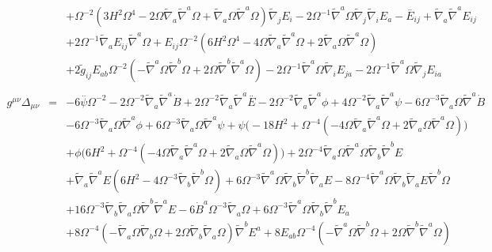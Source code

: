 \documentclass[10pt,letterpaper]{article}
\numberwithin{equation}{section}
\begin{document}
\begin{eqnarray}
&& + \Omega^{-2} (3 H^2 \Omega^4 - 2 \Omega \tilde{\nabla}_{a}\tilde{\nabla}^{a}\Omega + \tilde{\nabla}_{a}\Omega \tilde{\nabla}^{a}\Omega) \tilde{\nabla}_{j}E_{i} - 2 \Omega^{-1} \tilde{\nabla}^{a}\Omega \tilde{\nabla}_{j}\tilde{\nabla}_{i}E_{a}- \overset{..}{E}_{ij} + \tilde{\nabla}_{a}\tilde{\nabla}^{a}E_{ij} \nonumber \\ 
&& + 2 \Omega^{-1} \tilde{\nabla}_{a}E_{ij} \tilde{\nabla}^{a}\Omega + E_{ij} \Omega^{-2} (6 H^2 \Omega^4 - 4 \Omega \tilde{\nabla}_{a}\tilde{\nabla}^{a}\Omega + 2 \tilde{\nabla}_{a}\Omega \tilde{\nabla}^{a}\Omega) \nonumber \\ 
&& + 2 \tilde{g}_{ij} E_{ab} \Omega^{-2} (- \tilde{\nabla}^{a}\Omega \tilde{\nabla}^{b}\Omega + 2 \Omega \tilde{\nabla}^{b}\tilde{\nabla}^{a}\Omega) - 2 \Omega^{-1} \tilde{\nabla}^{a}\Omega \tilde{\nabla}_{i}E_{ja} - 2 \Omega^{-1} \tilde{\nabla}^{a}\Omega \tilde{\nabla}_{j}E_{ia}
\\  \nonumber\\ 
g^{\mu\nu}\Delta_{\mu\nu}&=& -6 \overset{..}{\psi} \Omega^{-2} - 2 \Omega^{-2} \tilde{\nabla}_{a}\tilde{\nabla}^{a}\dot{B} + 2 \Omega^{-2} \tilde{\nabla}_{a}\tilde{\nabla}^{a}\overset{..}{E} - 2 \Omega^{-2} \tilde{\nabla}_{a}\tilde{\nabla}^{a}\phi + 4 \Omega^{-2} \tilde{\nabla}_{a}\tilde{\nabla}^{a}\psi - 6 \Omega^{-3} \tilde{\nabla}_{a}\Omega \tilde{\nabla}^{a}\dot{B} \nonumber \\ 
&& - 6 \Omega^{-3} \tilde{\nabla}_{a}\Omega \tilde{\nabla}^{a}\phi + 6 \Omega^{-3} \tilde{\nabla}_{a}\Omega \tilde{\nabla}^{a}\psi + \psi \bigl(-18 H^2 + \Omega^{-4} (-4 \Omega \tilde{\nabla}_{a}\tilde{\nabla}^{a}\Omega + 2 \tilde{\nabla}_{a}\Omega \tilde{\nabla}^{a}\Omega)\bigr) \nonumber \\ 
&& + \phi \bigl(6 H^2 + \Omega^{-4} (-4 \Omega \tilde{\nabla}_{a}\tilde{\nabla}^{a}\Omega + 2 \tilde{\nabla}_{a}\Omega \tilde{\nabla}^{a}\Omega)\bigr) + 2 \Omega^{-4} \tilde{\nabla}_{a}\Omega \tilde{\nabla}^{a}\Omega \tilde{\nabla}_{b}\tilde{\nabla}^{b}E \nonumber \\ 
&& + \tilde{\nabla}_{a}\tilde{\nabla}^{a}E (6 H^2 - 4 \Omega^{-3} \tilde{\nabla}_{b}\tilde{\nabla}^{b}\Omega) + 6 \Omega^{-3} \tilde{\nabla}^{a}\Omega \tilde{\nabla}_{b}\tilde{\nabla}^{b}\tilde{\nabla}_{a}E - 8 \Omega^{-4} \tilde{\nabla}^{a}\Omega \tilde{\nabla}_{b}\tilde{\nabla}_{a}E \tilde{\nabla}^{b}\Omega \nonumber \\ 
&& + 16 \Omega^{-3} \tilde{\nabla}_{b}\tilde{\nabla}_{a}\Omega \tilde{\nabla}^{b}\tilde{\nabla}^{a}E-6 \dot{B}^{a} \Omega^{-3} \tilde{\nabla}_{a}\Omega + 6 \Omega^{-3} \tilde{\nabla}^{a}\Omega \tilde{\nabla}_{b}\tilde{\nabla}^{b}E_{a} \nonumber \\ 
&& + 8 \Omega^{-4} (- \tilde{\nabla}_{a}\Omega \tilde{\nabla}_{b}\Omega + 2 \Omega \tilde{\nabla}_{b}\tilde{\nabla}_{a}\Omega) \tilde{\nabla}^{b}E^{a}+8 E_{ab} \Omega^{-4} (- \tilde{\nabla}^{a}\Omega \tilde{\nabla}^{b}\Omega + 2 \Omega \tilde{\nabla}^{b}\tilde{\nabla}^{a}\Omega)
\end{eqnarray}
%
%
\end{document}
